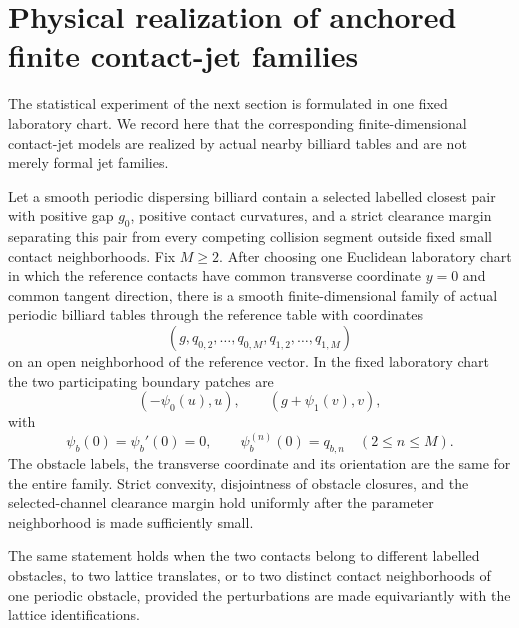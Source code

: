 \section{Physical realization of anchored finite contact-jet families}
\label{sec:v21-anchored-realization}

The statistical experiment of the next section is formulated in one fixed
laboratory chart.  We record here that the corresponding finite-dimensional
contact-jet models are realized by actual nearby billiard tables and are not
merely formal jet families.

\begin{proposition}
\label{prop:v21-anchored-realization}
Let a smooth periodic dispersing billiard contain a selected labelled closest
pair with positive gap $g_0$, positive contact curvatures, and a strict
clearance margin separating this pair from every competing collision segment
outside fixed small contact neighborhoods.  Fix $M\ge2$.  After choosing one
Euclidean laboratory chart in which the reference contacts have common
transverse coordinate $y=0$ and common tangent direction, there is a smooth
finite-dimensional family of actual periodic billiard tables through the
reference table with coordinates
\[
 (g,q_{0,2},\ldots,q_{0,M},q_{1,2},\ldots,q_{1,M})
\]
on an open neighborhood of the reference vector.  In the fixed laboratory
chart the two participating boundary patches are
\begin{equation}\label{eq:v21-realized-anchored-graphs}
 (-\psi_{0}(u),u),\qquad (g+\psi_{1}(v),v),
\end{equation}
with
\[
 \psi_b(0)=\psi_b'(0)=0,
 \qquad
 \psi_b^{(n)}(0)=q_{b,n}\quad(2\le n\le M).
\]
The obstacle labels, the transverse coordinate and its orientation are the
same for the entire family.  Strict convexity, disjointness of obstacle
closures, and the selected-channel clearance margin hold uniformly after the
parameter neighborhood is made sufficiently small.

The same statement holds when the two contacts belong to different labelled
obstacles, to two lattice translates, or to two distinct contact neighborhoods
of one periodic obstacle, provided the perturbations are made equivariantly
with the lattice identifications.
\end{proposition}


